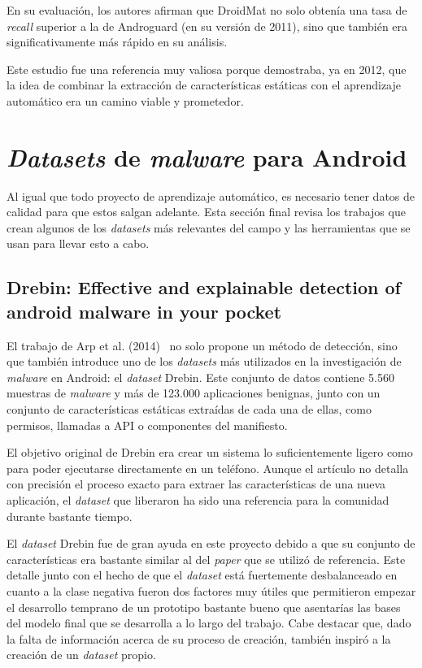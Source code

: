 En su evaluación, los autores afirman que DroidMat no solo obtenía una tasa de \textit{recall} superior a la de Androguard (en su versión de 2011), sino que también era significativamente más rápido en su análisis.

Este estudio fue una referencia muy valiosa porque demostraba, ya en 2012, que la idea de combinar la extracción de características estáticas con el aprendizaje automático era un camino viable y prometedor.

\section{\textit{Datasets} de \textit{malware} para Android}

Al igual que todo proyecto de aprendizaje automático, es necesario tener datos de calidad para que estos salgan adelante. Esta sección final revisa los trabajos que crean algunos de los \textit{datasets} más relevantes del campo y las herramientas que se usan para llevar esto a cabo.

\subsection{Drebin: Effective and explainable detection of android malware in your pocket}
El trabajo de Arp et al. (2014)~\cite{arp2014drebin} no solo propone un método de detección, sino que también introduce uno de los \textit{datasets} más utilizados en la investigación de \textit{malware} en Android: el \textit{dataset} Drebin. Este conjunto de datos contiene 5.560 muestras de \textit{malware} y más de 123.000 aplicaciones benignas, junto con un conjunto de características estáticas extraídas de cada una de ellas, como permisos, llamadas a API o componentes del manifiesto.

El objetivo original de Drebin era crear un sistema lo suficientemente ligero como para poder ejecutarse directamente en un teléfono. Aunque el artículo no detalla con precisión el proceso exacto para extraer las características de una nueva aplicación, el \textit{dataset} que liberaron ha sido una referencia para la comunidad durante bastante tiempo.

El \textit{dataset} Drebin fue de gran ayuda en este proyecto debido a que su conjunto de características era bastante similar al del \textit{paper} que se utilizó de referencia. Este detalle junto con el hecho de que el \textit{dataset} está fuertemente desbalanceado en cuanto a la clase negativa fueron dos factores muy útiles que permitieron empezar el desarrollo temprano de un prototipo bastante bueno que asentarías las bases del modelo final que se desarrolla a lo largo del trabajo. Cabe destacar que, dado la falta de información acerca de su proceso de creación, también inspiró a la creación de un \textit{dataset} propio.

